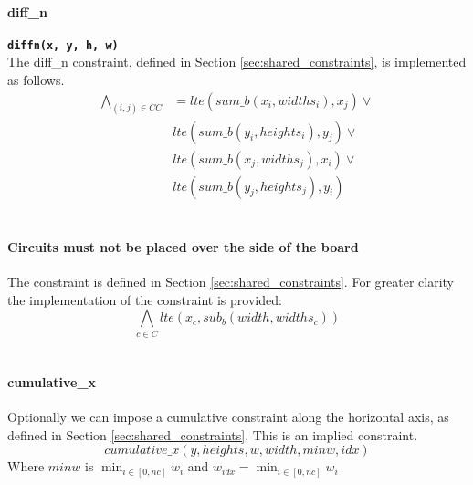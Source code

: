     \paragraph*{diff\_n}
      \texttt\textbf{diffn(x, y, h, w)}\\
      The diff\_n constraint, defined in Section \ref{sec:shared_constraints}, is implemented
      as follows.
      \begin{equation}
          \begin{split}
              \bigwedge_{(i, j) \in CC}&=
              lte(sum\_b(x_i, widths_i), x_j) \lor \\
              &lte(sum\_b(y_i, heights_i), y_j) \lor \\
              &lte(sum\_b(x_j, widths_j), x_i) \lor \\
              &lte(sum\_b(y_j, heights_j), y_i)
          \end{split}
      \end{equation}\\

    \paragraph*{Circuits must not be placed over the side of the board}
      The constraint is defined in Section \ref{sec:shared_constraints}. 
      For greater clarity the implementation of the constraint is provided:
      \begin{equation}
          \bigwedge_{c \in C} lte(x_c, sub_b(width, widths_c))
      \end{equation}\\

    \paragraph*{cumulative\_x}
      Optionally we can impose a cumulative constraint along the horizontal axis, 
      as defined in Section \ref{sec:shared_constraints}.
      This is an implied constraint.
      \[cumulative\_x(y, heights, w, width, minw, idx) \]
      Where \(minw\) is \(\min_{i \in [0,nc]} w_i\) and \( w_{idx} 
      = \min_{i \in [0,nc]} w_i\)
      

    
